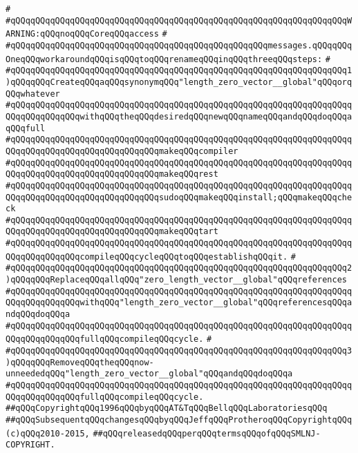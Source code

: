 \verb|#|\newline
\verb|#qQQqqQQqqQQqqQQqqQQqqQQqqQQqqQQqqQQqqQQqqQQqqQQqqQQqqQQqqQQqqQQqqQQqWARNING:qQQqnoqQQqCoreqQQqaccess|\newline
\verb|#|\newline
\verb|#qQQqqQQqqQQqqQQqqQQqqQQqqQQqqQQqqQQqqQQqqQQqqQQqqQQqmessages.qQQqqQQqOneqQQqworkaroundqQQqisqQQqtoqQQqrenameqQQqinqQQqthreeqQQqsteps:|\newline
\verb|#|\newline
\verb|#qQQqqQQqqQQqqQQqqQQqqQQqqQQqqQQqqQQqqQQqqQQqqQQqqQQqqQQqqQQqqQQqqQQq1)qQQqqQQqCreateqQQqaqQQqsynonymqQQq"length_zero_vector__global"qQQqorqQQqwhatever|\newline
\verb|#qQQqqQQqqQQqqQQqqQQqqQQqqQQqqQQqqQQqqQQqqQQqqQQqqQQqqQQqqQQqqQQqqQQqqQQqqQQqqQQqqQQqwithqQQqtheqQQqdesiredqQQqnewqQQqnameqQQqandqQQqdoqQQqaqQQqfull|\newline
\verb|#qQQqqQQqqQQqqQQqqQQqqQQqqQQqqQQqqQQqqQQqqQQqqQQqqQQqqQQqqQQqqQQqqQQqqQQqqQQqqQQqqQQqqQQqqQQqqQQqqQQqmakeqQQqcompiler|\newline
\verb|#qQQqqQQqqQQqqQQqqQQqqQQqqQQqqQQqqQQqqQQqqQQqqQQqqQQqqQQqqQQqqQQqqQQqqQQqqQQqqQQqqQQqqQQqqQQqqQQqqQQqmakeqQQqrest|\newline
\verb|#qQQqqQQqqQQqqQQqqQQqqQQqqQQqqQQqqQQqqQQqqQQqqQQqqQQqqQQqqQQqqQQqqQQqqQQqqQQqqQQqqQQqqQQqqQQqqQQqqQQqsudoqQQqmakeqQQqinstall;qQQqmakeqQQqcheck|\newline
\verb|#qQQqqQQqqQQqqQQqqQQqqQQqqQQqqQQqqQQqqQQqqQQqqQQqqQQqqQQqqQQqqQQqqQQqqQQqqQQqqQQqqQQqqQQqqQQqqQQqqQQqmakeqQQqtart|\newline
\verb|#qQQqqQQqqQQqqQQqqQQqqQQqqQQqqQQqqQQqqQQqqQQqqQQqqQQqqQQqqQQqqQQqqQQqqQQqqQQqqQQqqQQqcompileqQQqcycleqQQqtoqQQqestablishqQQqit.|\newline
\verb|#|\newline
\verb|#qQQqqQQqqQQqqQQqqQQqqQQqqQQqqQQqqQQqqQQqqQQqqQQqqQQqqQQqqQQqqQQqqQQq2)qQQqqQQqReplaceqQQqallqQQq"zero_length_vector__global"qQQqreferences|\newline
\verb|#qQQqqQQqqQQqqQQqqQQqqQQqqQQqqQQqqQQqqQQqqQQqqQQqqQQqqQQqqQQqqQQqqQQqqQQqqQQqqQQqqQQqwithqQQq"length_zero_vector__global"qQQqreferencesqQQqandqQQqdoqQQqa|\newline
\verb|#qQQqqQQqqQQqqQQqqQQqqQQqqQQqqQQqqQQqqQQqqQQqqQQqqQQqqQQqqQQqqQQqqQQqqQQqqQQqqQQqqQQqfullqQQqcompileqQQqcycle.|\newline
\verb|#|\newline
\verb|#qQQqqQQqqQQqqQQqqQQqqQQqqQQqqQQqqQQqqQQqqQQqqQQqqQQqqQQqqQQqqQQqqQQq3)qQQqqQQqRemoveqQQqtheqQQqnow-unneededqQQq"length_zero_vector__global"qQQqandqQQqdoqQQqa|\newline
\verb|#qQQqqQQqqQQqqQQqqQQqqQQqqQQqqQQqqQQqqQQqqQQqqQQqqQQqqQQqqQQqqQQqqQQqqQQqqQQqqQQqqQQqfullqQQqcompileqQQqcycle.|\newline
\newline
\newline
\verb|##qQQqCopyrightqQQq1996qQQqbyqQQqAT&TqQQqBellqQQqLaboratoriesqQQq|\newline
\verb|##qQQqSubsequentqQQqchangesqQQqbyqQQqJeffqQQqProtheroqQQqCopyrightqQQq(c)qQQq2010-2015,|\newline
\verb|##qQQqreleasedqQQqperqQQqtermsqQQqofqQQqSMLNJ-COPYRIGHT.|\newline

